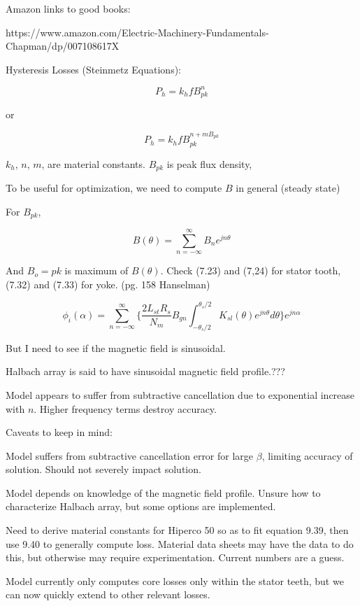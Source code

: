 \documentclass[10pt]{article}
\begin{document}
Amazon links to good books:

https://www.amazon.com/Electric-Machinery-Fundamentals-Chapman/dp/007108617X

Hysteresis Losses (Steinmetz Equations):

\begin{equation}
P_h = k_hfB_{pk}^n
\end{equation}

or 

\begin{equation}
P_h = k_hfB_{pk}^{n+mB_{pk}}
\end{equation}

$k_h$, $n$, $m$, are material constants. $B_{pk}$ is peak flux density,

To be useful for optimization, we need to compute $B$ in general (steady state)

For $B_{pk}$,

\begin{equation}
B(\theta) = \sum_{n=-\infty}^{\infty}B_ne^{jn\theta}
\end{equation}

And $B_o={pk}$ is maximum of $B(\theta)$. Check (7.23) and (7,24) for stator tooth, (7.32) and (7.33) for yoke. (pg. 158 Hanselman)

\begin{equation}
\phi_i(\alpha) = \sum_{n=-\infty}^{\infty}\bigg\{\frac{2L_{st}R_s}{N_m}B_{gn}\int_{-\theta_s/2}^{\theta_s/2}K_{sl}(\theta)e^{jn\theta}d\theta{}\bigg\}e^{jn\alpha}
\end{equation}

But I need to see if the magnetic field is sinusoidal.

Halbach array is said to have sinusoidal magnetic field profile.???

Model appears to suffer from subtractive cancellation due to exponential increase with $n$. Higher frequency terms destroy accuracy. 



Caveats to keep in mind:

Model suffers from subtractive cancellation error for large $\beta$, limiting accuracy of solution. Should not severely impact solution.

Model depends on knowledge of the magnetic field profile. Unsure how to characterize Halbach array, but some options are implemented.

Need to derive material constants for Hiperco 50 so as to fit equation 9.39, then use 9.40 to generally compute loss. Material data sheets may have the data to do this, but otherwise may require experimentation. Current numbers are a guess.

Model currently only computes core losses only within the stator teeth, but we can now quickly extend to other relevant losses.
\end{document}
